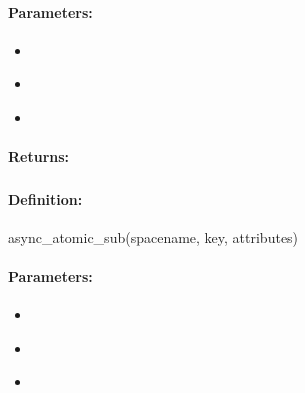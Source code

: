\paragraph{Parameters:}
\begin{itemize}[noitemsep]
\item {}\\

\item {}\\

\item {}\\

\end{itemize}

\paragraph{Returns:}


\pagebreak
\subsubsection{}
\label{api:ruby:async_atomic_sub}


\paragraph{Definition:}
\begin{rubycode}
async_atomic_sub(spacename, key, attributes)
\end{rubycode}

\paragraph{Parameters:}
\begin{itemize}[noitemsep]
\item {}\\

\item {}\\

\item {}\\

\end{itemize}


